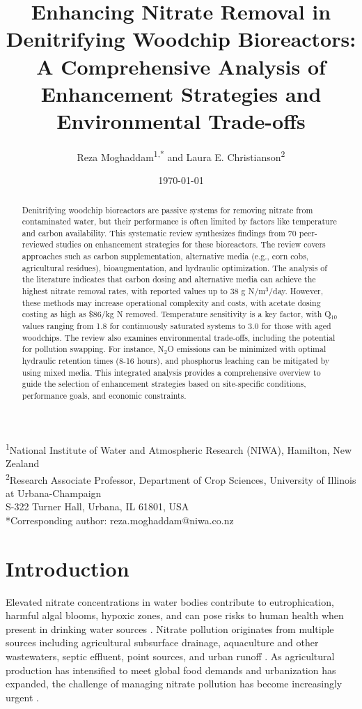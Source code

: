 \documentclass[12pt,a4paper]{article}
\title{Enhancing Nitrate Removal in Denitrifying Woodchip Bioreactors: A Comprehensive Analysis of Enhancement Strategies and Environmental Trade-offs}
\author{Reza Moghaddam\textsuperscript{1,*} and Laura E. Christianson\textsuperscript{2}}
\date{\today}
\begin{document}
\maketitle

\begin{center}
\footnotesize
\textsuperscript{1}National Institute of Water and Atmospheric Research (NIWA), Hamilton, New Zealand\\
\textsuperscript{2}Research Associate Professor, Department of Crop Sciences, University of Illinois at Urbana-Champaign\\
S-322 Turner Hall, Urbana, IL 61801, USA\\
*Corresponding author: reza.moghaddam@niwa.co.nz
\end{center}

\begin{abstract}
Denitrifying woodchip bioreactors are passive systems for removing nitrate from contaminated water, but their performance is often limited by factors like temperature and carbon availability. This systematic review synthesizes findings from 70 peer-reviewed studies on enhancement strategies for these bioreactors. The review covers approaches such as carbon supplementation, alternative media (e.g., corn cobs, agricultural residues), bioaugmentation, and hydraulic optimization. The analysis of the literature indicates that carbon dosing and alternative media can achieve the highest nitrate removal rates, with reported values up to 38 g N/m$^3$/day. However, these methods may increase operational complexity and costs, with acetate dosing costing as high as \$86/kg N removed. Temperature sensitivity is a key factor, with Q$_{10}$ values ranging from 1.8 for continuously saturated systems to 3.0 for those with aged woodchips. The review also examines environmental trade-offs, including the potential for pollution swapping. For instance, N$_{2}$O emissions can be minimized with optimal hydraulic retention times (8-16 hours), and phosphorus leaching can be mitigated by using mixed media. This integrated analysis provides a comprehensive overview to guide the selection of enhancement strategies based on site-specific conditions, performance goals, and economic constraints.
\end{abstract}

\section{Introduction}

Elevated nitrate concentrations in water bodies contribute to eutrophication, harmful algal blooms, hypoxic zones, and can pose risks to human health when present in drinking water sources \citep{RN1181}. Nitrate pollution originates from multiple sources including agricultural subsurface drainage, aquaculture and other wastewaters, septic effluent, point sources, and urban runoff \citep{RN1181, RN310}. As agricultural production has intensified to meet global food demands and urbanization has expanded, the challenge of managing nitrate pollution has become increasingly urgent \citep{RN312}.
\end{document}

